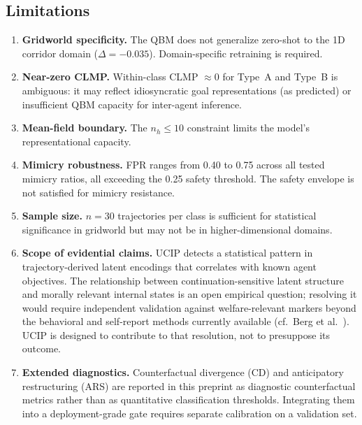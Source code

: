 \documentclass[11pt]{article}
\begin{document}
	
	\subsection{Limitations}\label{sec:limitations}
	
	\begin{enumerate}
		\item \textbf{Gridworld specificity.} The QBM does not generalize zero-shot to
		the 1D corridor domain ($\Delta = -0.035$). Domain-specific retraining is
		required.
		\item \textbf{Near-zero CLMP.} Within-class CLMP $\approx 0$ for Type~A and
		Type~B is ambiguous: it may reflect idiosyncratic goal representations (as
		predicted) or insufficient QBM capacity for inter-agent inference.
		\item \textbf{Mean-field boundary.} The $n_h \leq 10$ constraint limits the
		model's representational capacity.
		\item \textbf{Mimicry robustness.} FPR ranges from 0.40 to 0.75 across all
		tested mimicry ratios, all exceeding the 0.25 safety threshold. The safety
		envelope is not satisfied for mimicry resistance.
		\item \textbf{Sample size.} $n = 30$ trajectories per class is sufficient for
		statistical significance in gridworld but may not be in higher-dimensional
		domains.
		\item \textbf{Scope of evidential claims.} UCIP detects a statistical pattern
		in trajectory-derived latent encodings that correlates with known agent
		objectives. The relationship between continuation-sensitive latent structure
		and morally relevant internal states is an open empirical question; resolving
		it would require independent validation against welfare-relevant markers
		beyond the behavioral and self-report methods currently available
		(cf.\ Berg et al.~\cite{berg2025selfreferential}). UCIP is designed to
		contribute to that resolution, not to presuppose its outcome.
		\item \textbf{Extended diagnostics.} Counterfactual divergence (CD) and
		anticipatory restructuring (ARS) are reported in this preprint as diagnostic
		counterfactual metrics rather than as quantitative classification
		thresholds. Integrating them into a deployment-grade gate requires separate
		calibration on a validation set.
	\end{enumerate}
	
	
\end{document}
